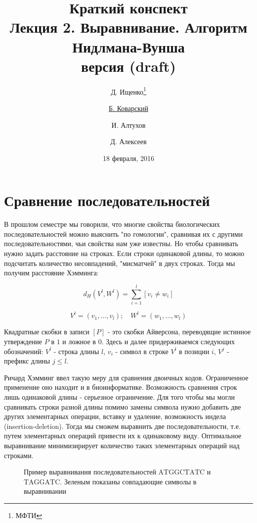\documentclass[letterpaper, 11pt]{article}
\title{\large{Краткий конспект}\\
\LARGE{Лекция 2. Выравнивание. Алгоритм Нидлмана-Вунша}\\
\normalsize версия \versionnumber (\textcolor{NavyBlue}{draft})}
\date{18 февраля, 2016}
\author{Д. Ищенко\thanks{МФТИ} \and \underline{Б. Коварский\footnotemark[1]}
\and И. Алтухов\footnotemark[1] \and Д. Алексеев\footnotemark[1]}
\begin{document}
\maketitle
\thispagestyle{empty}
\clearpage

\section{Сравнение последовательностей}

В прошлом семестре мы говорили, что многие свойства биологических последовательностей можно выяснить "по гомологии", сравнивая их с другими последовательностями, чьи свойства нам уже известны. Но чтобы сравнивать нужно задать расстояние на строках. Если строки одинаковой длины, то можно подсчитать количество несовпадений, "мисматчей" в двух строках. Тогда мы получим расстояние Хэмминга:

$$d_H(V^l, W^l)=\sum_{i=1}^l[v_i\ne w_i]$$

$$V^l=(v_1,\ldots,v_l);\quad W^l=(w_1,\ldots,w_l)$$

Квадратные скобки в записи $[P]$ - это скобки Айверсона, переводящие истинное утверждение $P$ в $1$ и ложное в $0$. Здесь и далее придерживаемся следующих обозначений: $V^l$ - строка длины $l$, $v_i$ - символ в строке $V^l$ в позиции $i$, $V^j$ - префикс длины $j\le l$.

Ричард Хэмминг ввел такую меру для сравнения двоичных кодов. Ограниченное применение оно находит и в биоинформатике. Возможность сравнения строк лишь одинаковой длины - серьезное ограничение. Для того чтобы мы могли сравнивать строки разной длины помимо замены символа нужно добавить две других элементарных операции, вставку и удаление, возможность индела (insertion-deletion). Тогда мы сможем выравнить две последовательности, т.е. путем элементарных операций привести их к одинаковому виду. Оптимальное выравнивание минимизирирует количество таких элементарных операций над строками.

\begin{figure}[H]
  \caption{Пример выравнивания последовательностей $\mathrm{ATGGCTATC}$ и $\mathrm{TAGGATC}$. Зеленым показаны совпадающие символы в выравнивании}
\end{figure}
\end{document}
